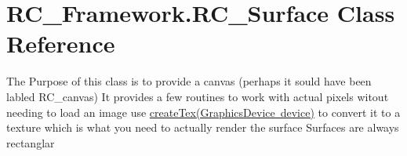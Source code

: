 \hypertarget{class_r_c___framework_1_1_r_c___surface}{}\section{R\+C\+\_\+\+Framework.\+R\+C\+\_\+\+Surface Class Reference}
\label{class_r_c___framework_1_1_r_c___surface}


The Purpose of this class is to provide a canvas (perhaps it sould have been labled R\+C\+\_\+canvas) It provides a few routines to work with actual pixels witout needing to load an image use \mbox{\hyperlink{class_r_c___framework_1_1_r_c___surface_a88a1b5fd5ab87f2f3cdb9bf0bc825ffc}{create\+Tex(\+Graphics\+Device device)}} to convert it to a texture which is what you need to actually render the surface Surfaces are always rectanglar  


